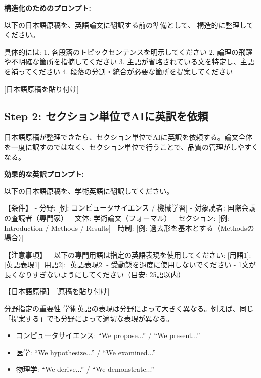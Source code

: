\textbf{構造化のためのプロンプト:}

\begin{promptbox}
以下の日本語原稿を、英語論文に翻訳する前の準備として、
構造的に整理してください。

具体的には:
1. 各段落のトピックセンテンスを明示してください
2. 論理の飛躍や不明確な箇所を指摘してください
3. 主語が省略されている文を特定し、主語を補ってください
4. 段落の分割・統合が必要な箇所を提案してください

{[}日本語原稿を貼り付け]
\end{promptbox}

\subsection*{Step 2: セクション単位でAIに英訳を依頼}

日本語原稿が整理できたら、セクション単位でAIに英訳を依頼する。論文全体を一度に訳すのではなく、セクション単位で行うことで、品質の管理がしやすくなる。

\textbf{効果的な英訳プロンプト:}

\begin{promptbox}
以下の日本語原稿を、学術英語に翻訳してください。

【条件】
- 分野: [例: コンピュータサイエンス / 機械学習]
- 対象読者: 国際会議の査読者（専門家）
- 文体: 学術論文（フォーマル）
- セクション: [例: Introduction / Methods / Results]
- 時制: [例: 過去形を基本とする（Methodsの場合）]

【注意事項】
- 以下の専門用語は指定の英語表現を使用してください:
  [用語1]: [英語表現1]
  [用語2]: [英語表現2]
- 受動態を過度に使用しないでください
- 1文が長くなりすぎないようにしてください（目安: 25語以内）

【日本語原稿】
{[}原稿を貼り付け]
\end{promptbox}

\begin{itembox}[l]{分野指定の重要性}
学術英語の表現は分野によって大きく異なる。例えば、同じ「提案する」でも分野によって適切な表現が異なる。
\begin{itemize}
\item コンピュータサイエンス: ``We propose...'' / ``We present...''
\item 医学: ``We hypothesize...'' / ``We examined...''
\item 物理学: ``We derive...'' / ``We demonstrate...''
\end{itemize}
\end{itembox}

